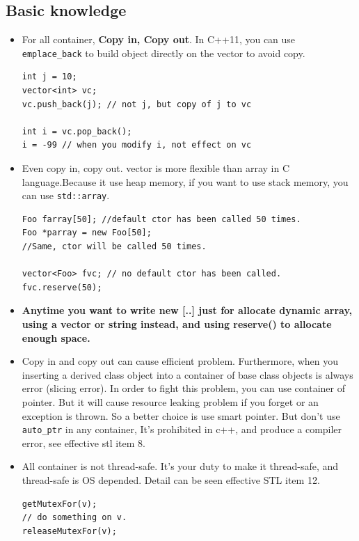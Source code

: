 \documentclass[a4paper,11pt,twoside]{book}
\begin{document}
\subsection{Basic knowledge}
\begin{itemize}

\item For all container, \textbf{Copy in, Copy out}. In C++11, you can use \texttt{emplace\_back} to build object directly on the vector to avoid copy.
\begin{lstlisting}[numbers=none]
int j = 10;
vector<int> vc;
vc.push_back(j); // not j, but copy of j to vc

int i = vc.pop_back(); 
i = -99 // when you modify i, not effect on vc
\end{lstlisting}

\item Even copy in, copy out. vector is more flexible than array in C language.Because it use heap memory, if you want to use stack memory, you can use \texttt{std::array}.
\begin{lstlisting}[numbers=none]
Foo farray[50]; //default ctor has been called 50 times.
Foo *parray = new Foo[50]; 
//Same, ctor will be called 50 times.

vector<Foo> fvc; // no default ctor has been called.
fvc.reserve(50);
\end{lstlisting}

\item \textbf{Anytime you want to write new [..] just for allocate dynamic array, using a vector or string instead, and using reserve() to allocate enough space.}


\item Copy in and copy out can cause efficient problem. Furthermore, when you inserting a derived class object into a container of base class objects is always error (slicing error). In order to fight this problem, you can use container of pointer. But it will cause resource leaking problem if you forget or an exception is thrown. So a better choice is use smart pointer. But don't use \texttt{auto\_ptr} in any container, It's prohibited in c++, and produce a compiler error, see effective stl item 8.

\item All container is not thread-safe. It's your duty to make it thread-safe, and thread-safe is OS depended. Detail can be seen effective STL item 12.
\begin{lstlisting}[numbers=none]
getMutexFor(v);
// do something on v.
releaseMutexFor(v);
\end{lstlisting}


\end{itemize}
\end{document}
